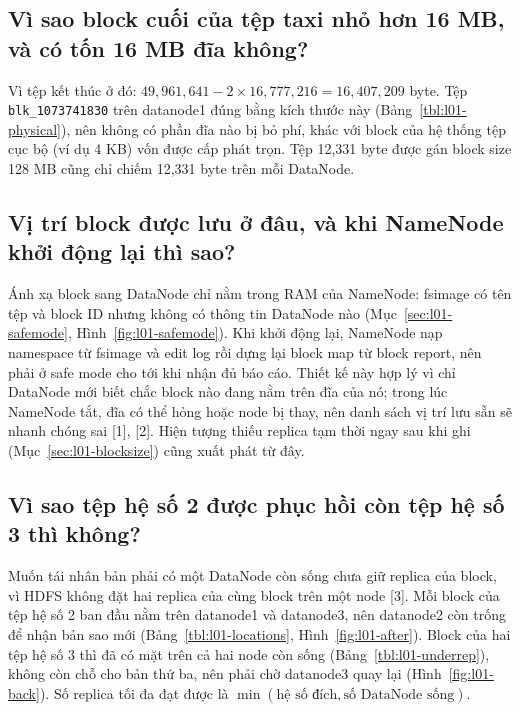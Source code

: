 \documentclass[
  12pt,
  a4paper,
]{article}
\begin{document}
\subsection{Vì sao block cuối của tệp taxi nhỏ hơn 16 MB, và có tốn 16
MB đĩa không?}\label{sec:l01-q2}

Vì tệp kết thúc ở đó:
\(49{,}961{,}641 - 2 \times 16{,}777{,}216 = 16{,}407{,}209\) byte. Tệp
\texttt{blk\_1073741830} trên datanode1 đúng bằng kích thước này
(Bảng~\ref{tbl:l01-physical}), nên không có phần đĩa nào bị bỏ phí, khác
với block của hệ thống tệp cục bộ (ví dụ 4 KB) vốn được cấp phát trọn.
Tệp 12,331 byte được gán block size 128 MB cũng chỉ chiếm 12,331 byte
trên mỗi DataNode.

\subsection{Vị trí block được lưu ở đâu, và khi NameNode khởi động lại
thì sao?}\label{sec:l01-q3}

Ánh xạ block sang DataNode chỉ nằm trong RAM của NameNode: fsimage có
tên tệp và block ID nhưng không có thông tin DataNode nào
(Mục~\ref{sec:l01-safemode}, Hình~\ref{fig:l01-safemode}). Khi khởi động
lại, NameNode nạp namespace từ fsimage và edit log rồi dựng lại block
map từ block report, nên phải ở safe mode cho tới khi nhận đủ báo cáo.
Thiết kế này hợp lý vì chỉ DataNode mới biết chắc block nào đang nằm
trên đĩa của nó; trong lúc NameNode tắt, đĩa có thể hỏng hoặc node bị
thay, nên danh sách vị trí lưu sẵn sẽ nhanh chóng sai {[}1{]}, {[}2{]}.
Hiện tượng thiếu replica tạm thời ngay sau khi ghi
(Mục~\ref{sec:l01-blocksize}) cũng xuất phát từ đây.

\subsection{Vì sao tệp hệ số 2 được phục hồi còn tệp hệ số 3 thì
không?}\label{sec:l01-q4}

Muốn tái nhân bản phải có một DataNode còn sống chưa giữ replica của
block, vì HDFS không đặt hai replica của cùng block trên một node
{[}3{]}. Mỗi block của tệp hệ số 2 ban đầu nằm trên datanode1 và
datanode3, nên datanode2 còn trống để nhận bản sao mới
(Bảng~\ref{tbl:l01-locations}, Hình~\ref{fig:l01-after}). Block của hai
tệp hệ số 3 thì đã có mặt trên cả hai node còn sống
(Bảng~\ref{tbl:l01-underrep}), không còn chỗ cho bản thứ ba, nên phải
chờ datanode3 quay lại (Hình~\ref{fig:l01-back}). Số replica tối đa đạt
được là \(\min(\text{hệ số đích}, \text{số DataNode sống})\).
\end{document}
